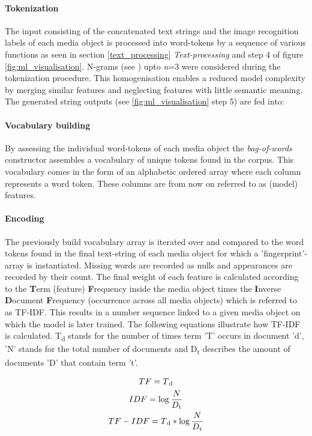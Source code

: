 \paragraph*{Tokenization} The input consisting of the concatenated text strings and the image recognition labels of each media object is processed into word-tokens by a sequence of various functions as seen in section \ref{text_processing} \textit{Text-processing} and step 4 of figure \ref{fig:ml_visualisation}. N-grams (see ) upto \textit{n}=3 were considered during the tokenization procedure. This homogenisation enables a reduced model complexity by merging similar features and neglecting features with little semantic meaning. The generated string outputs (see \ref{fig:ml_visualisation} step 5) are fed into:

\paragraph*{Vocabulary building} By assessing the individual word-tokens of each media object the \textit{bag-of-words} constructor assembles a vocabulary of unique tokens found in the corpus. This vocabulary comes in the form of an alphabetic ordered array where each column represents a word token. These columns are from now on referred to as (model) features.

\paragraph*{Encoding} The previously build vocabulary array is iterated over and compared to the word tokens found in the final text-string of each media object for which a 'fingerprint'-array is instantiated. Missing words are recorded as nulls and appearances are recorded by their count. The final weight of each feature is calculated according to the \textbf{T}erm (feature) \textbf{F}requency inside the media object times the \textbf{I}nverse  \textbf{D}ocument  \textbf{F}requency (occurrence across all media objects) which is referred to as TF-IDF. This results in a number sequence linked to a given media object on which the model is later trained. The following equations illustrate how TF-IDF is calculated. T\textsubscript{d} stands for the number of times term 'T' occurs in document 'd', 'N' stands for the total number of documents and D\textsubscript{t} describes the amount of documents 'D' that contain term 't'.

\begin{gather*}
TF = T\textsubscript{d}\\
IDF = \log\frac{N}{D\textsubscript{t}}\\
TF-IDF = T\textsubscript{d} * \log\frac{N}{D\textsubscript{t}}\\
\end{gather*}

